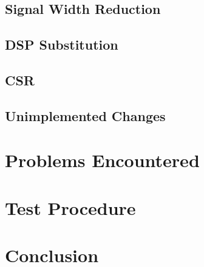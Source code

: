 \documentclass[a4paper,10pt]{article}
\begin{document}
\subsection{Signal Width Reduction}
\label{sec:Signal_Width}

\subsection{DSP Substitution}
\label{sec:DSP}

\subsection{CSR}
\label{sec:CSR}

\subsection{Unimplemented Changes}
\label{sec:Unimplemented_Changes}

\section{Problems Encountered}
\label{sec:Problems_Encountered}

\section{Test Procedure}
\label{sec:Test_Procedure}

\section{Conclusion}
\label{sec:Conclusion}

\newpage
\appendix
\end{document}
